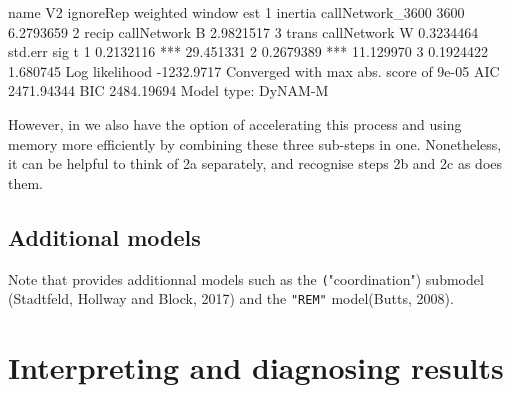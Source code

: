 \documentclass[article]{jss}
\begin{document}
\begin{Schunk}
\begin{Soutput}
     name               V2 ignoreRep weighted window       est
1 inertia callNetwork_3600                      3600 6.2793659
2   recip      callNetwork         B                 2.9821517
3   trans      callNetwork                  W        0.3234464
    std.err sig         t
1 0.2132116 *** 29.451331
2 0.2679389 *** 11.129970
3 0.1924422      1.680745
  Log likelihood -1232.9717 
  Converged with max abs. score of 9e-05 
  AIC  2471.94344 
  BIC  2484.19694 
  Model type: DyNAM-M 
\end{Soutput}
\end{Schunk}

However, in  we also have the option of accelerating this process and using memory more efficiently by combining these three sub-steps in one. Nonetheless, it can be helpful to think of 2a separately, and recognise steps 2b and 2c as  does them.


\subsection[Additional models]{Additional models} \label{subsec:addmodel}

\begin{leftbar}
Note that  provides additionnal models such as the \texttt("coordination") submodel (Stadtfeld, Hollway and Block, 2017) and the \texttt{"REM"} model(Butts, 2008).
\end{leftbar}





\section[Interpreting and diagnosing results]{Interpreting and diagnosing results} \label{subsec:diag_results}
\end{document}

